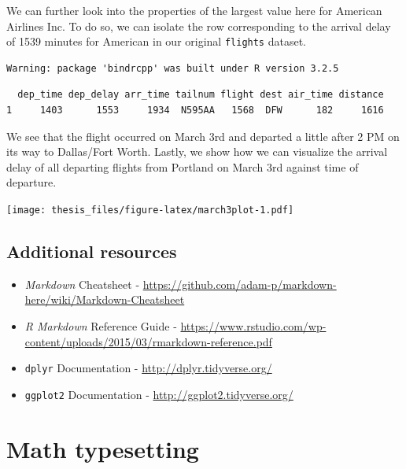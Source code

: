 \documentclass[12pt,twoside]{dukestatscithesis}
\theoremstyle{definition}
\theoremstyle{definition}
\theoremstyle{definition}
\theoremstyle{remark}
\begin{document}
We can further look into the properties of the largest value here for
American Airlines Inc. To do so, we can isolate the row corresponding to
the arrival delay of 1539 minutes for American in our original
\texttt{flights} dataset.
\begin{Shaded}
\end{Shaded}
\begin{verbatim}
Warning: package 'bindrcpp' was built under R version 3.2.5
\end{verbatim}
\begin{verbatim}
  dep_time dep_delay arr_time tailnum flight dest air_time distance
1     1403      1553     1934  N595AA   1568  DFW      182     1616
\end{verbatim}
We see that the flight occurred on March 3rd and departed a little after
2 PM on its way to Dallas/Fort Worth. Lastly, we show how we can
visualize the arrival delay of all departing flights from Portland on
March 3rd against time of departure.
\begin{Shaded}
\end{Shaded}
\texttt{[image: thesis\_files/figure-latex/march3plot-1.pdf]}

\section{Additional resources}\label{additional-resources}
\begin{itemize}
\item
  \emph{Markdown} Cheatsheet -
  \url{https://github.com/adam-p/markdown-here/wiki/Markdown-Cheatsheet}
\item
  \emph{R Markdown} Reference Guide -
  \url{https://www.rstudio.com/wp-content/uploads/2015/03/rmarkdown-reference.pdf}
\item
  \texttt{dplyr} Documentation - \url{http://dplyr.tidyverse.org/}
\item
  \texttt{ggplot2} Documentation - \url{http://ggplot2.tidyverse.org/}
\end{itemize}
\hypertarget{math}{\chapter{Math typesetting}\label{math}}
\end{document}
